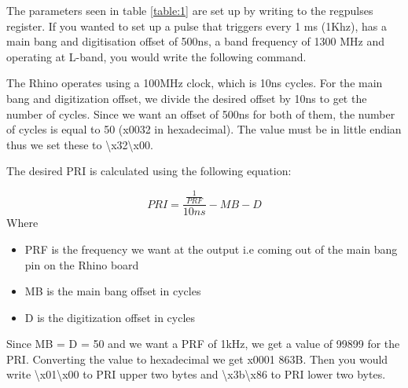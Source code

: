 \documentclass[12pt, a4paper]{article}
\begin{document}
\begin{flushleft}
The parameters seen in table \ref{table:1} are set up by writing to the reg\textunderscore pulses register. If you wanted to set up a pulse that triggers every 1 ms (1Khz), has a main bang and digitisation offset of 500ns, a band frequency of 1300 MHz and operating at L-band, you would write the following command. 


	\begin{flushleft}
	\end{flushleft}
	
\end{flushleft}

\begin{flushleft}
The Rhino operates using a 100MHz clock, which is 10ns cycles. For the main bang and digitization offset, we divide the desired offset by 10ns to get the number of cycles. Since we want an offset of 500ns for both of them, the number of cycles is equal to 50 (x0032 in hexadecimal). The value must be in little endian thus we set these to \textbackslash x32\textbackslash x00. 
\end{flushleft}

The desired PRI is calculated using the following equation:

	\[ 
		PRI = \frac{\frac{1}{PRF}}{10ns} - MB - D
	\]
Where
 
	\begin{itemize}
  		\item PRF is the frequency we want at the output i.e coming out of the main bang pin on the Rhino board
  		\item MB is the main bang offset in cycles
  		\item D is the digitization offset in cycles
	\end{itemize}

Since MB = D = 50 and we want a PRF of 1kHz, we get a value of 99899 for the PRI. Converting the value to hexadecimal we get x0001 863B. Then you would write \textbackslash x01\textbackslash x00 to PRI upper two bytes and \textbackslash x3b\textbackslash x86 to PRI lower two bytes.
\end{document}
